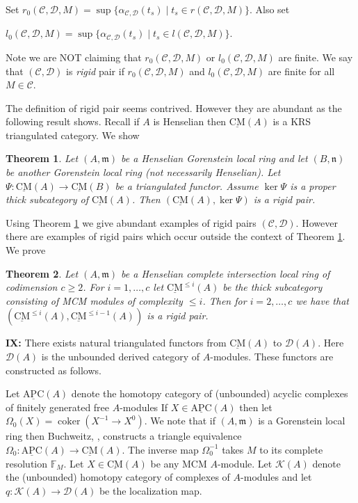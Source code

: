 \documentclass{amsart}
\newcommand{\D}{\mathcal{D} }
\newcommand{\n}{\mathfrak{n} }
\newcommand{\m}{\mathfrak{m} }
\newcommand{\C}{\mathcal{C}}
\newcommand{\Kc}{\mathcal{K} }
\newcommand{\Fb}{\mathbb{F} }
\newcommand{\rt}{\rightarrow}
\newcommand{\coker}{\operatorname{coker}}
\newcommand{\CMS}{\operatorname{\underline{CM}}}
\newcommand{\apc}{\operatorname{\underline{APC}}}
\theoremstyle{plain}
\newtheorem{theorem}{Theorem}[section]
\theoremstyle{definition}
\theoremstyle{remark}
\begin{document}
{Set $r_0(\C, \D, M) = \sup \{ \alpha_{\C, \D}(t_s) \mid t_s \in r(\C, \D, M) \}$. Also set

$l_0(\C, \D, M) = \sup \{ \alpha_{\C, \D}(t_s) \mid t_s \in l(\C, \D, M) \}$.

Note we are NOT claiming that $r_0(\C,\D, M)$ or $l_0(\C, \D, M)$ are finite.  We say that $(\C, \D)$ is \emph{rigid} pair if $r_0(\C,\D, M)$ and $l_0(\C, \D, M) $ are finite for all $M \in \C$.

The definition of rigid pair seems contrived. However they are abundant as the following result shows. Recall if $A$ is Henselian then $\CMS(A)$ is a KRS triangulated category. We show
\begin{theorem}
\label{rigid} Let $(A,\m)$ be a Henselian Gorenstein local ring and let $(B,\n)$ be another Gorenstein local ring (not necessarily Henselian). Let   $\Psi \colon \CMS(A) \rt \CMS(B)$ be a triangulated functor. Assume $\ker \Psi$  is a proper thick subcategory of $\CMS(A)$. Then $(\CMS(A), \ker \Psi)$ is a rigid pair.
\end{theorem}
Using Theorem \ref{rigid} we give abundant examples of rigid pairs $(\C, \D)$. However there are examples of rigid pairs which occur outside the context of Theorem \ref{rigid}. We prove
\begin{theorem}\label{rigid-ci}
Let $(A,\m)$ be a Henselian complete intersection local ring of codimension $c \geq 2$. For $i = 1, \ldots, c$ let $\CMS^{\leq i}(A)$ be the thick subcategory consisting of MCM modules of complexity $\leq i$. Then for $i = 2, \ldots,c$ we have that $(\CMS^{\leq i}(A), \CMS^{\leq i-1}(A))$ is a rigid pair.
\end{theorem}

\textbf{IX:}
There exists natural triangulated functors from $\CMS(A)$ to $\D(A)$. Here $\D(A)$ is the unbounded derived category of $A$-modules. These functors are constructed as follows.

Let $\apc(A)$ denote the
homotopy category of (unbounded) acyclic complexes of finitely  generated  free
$A$-modules
If $X \in \apc(A)$ then let $\Omega_0(X) = \coker(X^{-1} \rt X^0)$. We note that if $(A,\m)$ is a Gorenstein local ring then Buchweitz, \cite[4.4.1]{Bu},  constructs a triangle equivalence
$\Omega_0 \colon \apc(A) \rt \CMS(A)$. The inverse map $\Omega_0^{-1}$  takes $M$ to its complete resolution $\Fb_M$.  Let $X \in \CMS(A)$ be any MCM $A$-module. Let
$\Kc(A)$ denote the (unbounded) homotopy category of complexes of $A$-modules and let $q \colon \Kc(A) \rt \D(A)$ be the localization map.

}
\end{document}
